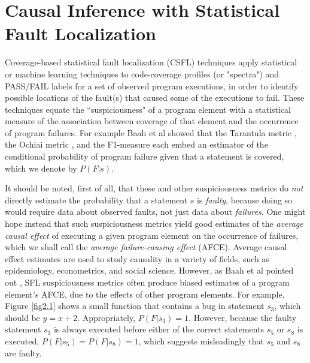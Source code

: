 \section{Causal Inference with Statistical Fault Localization}
Coverage-based statistical fault localization (CSFL) techniques apply statistical or machine learning techniques to code-coverage profiles (or "spectra") and PASS/FAIL labels for a set of observed program executions, in order to identify possible locations of the fault(s) that caused some of the executions to fail.  These techniques equate the ``suspiciousness" of a program element with a statistical measure of the association between coverage of that element and the occurrence of program failures.  For example Baah et al showed \cite{baah2010causal} that the Tarantula metric \cite{jones2002visualization}, the Ochiai metric \cite{abreu2007accuracy}, and the F1-measure \cite{baah2010causal} each embed an estimator of the conditional probability of program failure given that a statement  is covered, which we denote by $P(F|s)$.  

It should be noted, first of all, that these and other suspiciousness metrics do {\it not} directly estimate the probability that a statement $s$ is {\it faulty}, because doing so would require data about observed faults, not just data about {\it failures}.  One might hope instead that such suspiciousness metrics yield good estimates of the {\it average causal effect} \cite{pearl2000models} of executing a given program element on the occurrence of failures, which we shall call the {\it average failure-causing effect} (AFCE).  Average causal effect estimates are used to study causality in a variety of fields, such as epidemiology, econometrics, and social science.  However, as Baah et al pointed out \cite{baah2010causal}, SFL suspiciousness metrics often produce biased estimates of a program element’s AFCE, due to the effects of other program elements.  For example, Figure \ref{fig2.1} shows a small function that contains a bug in statement $s_3$, which should be $y=x+2$.  Appropriately, $P(F|s_3)=1$.  However, because the faulty statement $s_3$ is always executed before either of the correct statements $s_5$ or $s_8$ is executed, $P(F|s_5)=P(F|s_8)=1$, which suggests misleadingly that $s_5$ and $s_8$ are faulty.

